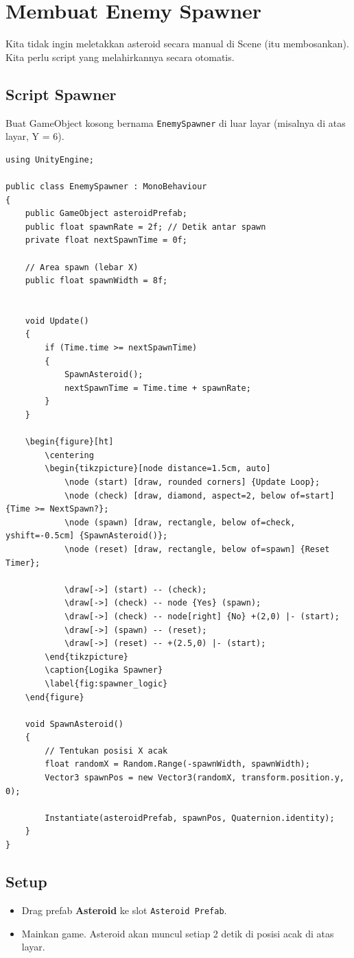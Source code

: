 
\section{Membuat Enemy Spawner}

Kita tidak ingin meletakkan asteroid secara manual di Scene (itu membosankan). Kita perlu script yang melahirkannya secara otomatis.

\subsection{Script Spawner}
Buat GameObject kosong bernama \texttt{EnemySpawner} di luar layar (misalnya di atas layar, Y = 6).

\begin{lstlisting}[language={[Sharp]C}]
using UnityEngine;

public class EnemySpawner : MonoBehaviour
{
    public GameObject asteroidPrefab;
    public float spawnRate = 2f; // Detik antar spawn
    private float nextSpawnTime = 0f;
    
    // Area spawn (lebar X)
    public float spawnWidth = 8f;


    void Update()
    {
        if (Time.time >= nextSpawnTime)
        {
            SpawnAsteroid();
            nextSpawnTime = Time.time + spawnRate;
        }
    }

    \begin{figure}[ht]
        \centering
        \begin{tikzpicture}[node distance=1.5cm, auto]
            \node (start) [draw, rounded corners] {Update Loop};
            \node (check) [draw, diamond, aspect=2, below of=start] {Time >= NextSpawn?};
            \node (spawn) [draw, rectangle, below of=check, yshift=-0.5cm] {SpawnAsteroid()};
            \node (reset) [draw, rectangle, below of=spawn] {Reset Timer};
            
            \draw[->] (start) -- (check);
            \draw[->] (check) -- node {Yes} (spawn);
            \draw[->] (check) -- node[right] {No} +(2,0) |- (start);
            \draw[->] (spawn) -- (reset);
            \draw[->] (reset) -- +(2.5,0) |- (start);
        \end{tikzpicture}
        \caption{Logika Spawner}
        \label{fig:spawner_logic}
    \end{figure}

    void SpawnAsteroid()
    {
        // Tentukan posisi X acak
        float randomX = Random.Range(-spawnWidth, spawnWidth);
        Vector3 spawnPos = new Vector3(randomX, transform.position.y, 0);
        
        Instantiate(asteroidPrefab, spawnPos, Quaternion.identity);
    }
}
\end{lstlisting}

\subsection{Setup}
\begin{itemize}
    \item Drag prefab \textbf{Asteroid} ke slot \texttt{Asteroid Prefab}.
    \item Mainkan game. Asteroid akan muncul setiap 2 detik di posisi acak di atas layar.
\end{itemize}
